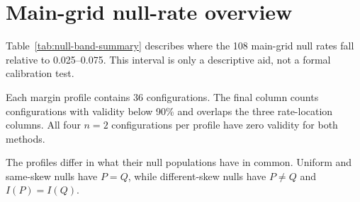 \FloatBarrier

\clearpage

\section{Main-grid null-rate overview}

Table~\ref{tab:null-band-summary} describes where the 108 main-grid
null rates fall relative to 0.025--0.075. This interval is only a
descriptive aid, not a formal calibration test.

Each margin profile contains 36 configurations. The final column counts
configurations with validity below 90\% and overlaps the three rate-location
columns. All four \(n=2\) configurations per profile have zero validity for
both methods.

The profiles differ in what their null populations have in common.
Uniform and same-skew nulls have \(P=Q\), while different-skew
nulls have \(P\ne Q\) and \(I(P)=I(Q)\).



\FloatBarrier
